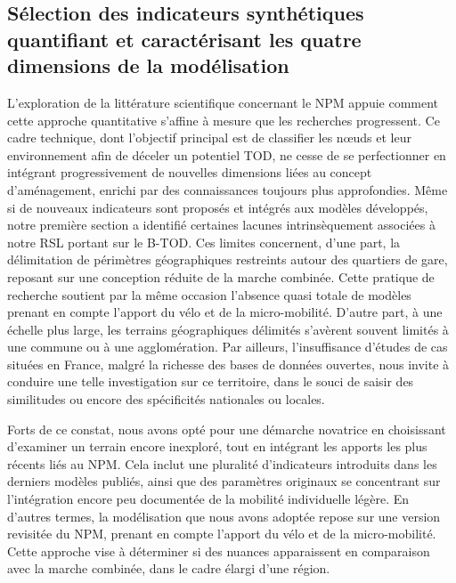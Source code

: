 \begin{refsegment}
    \newpage
\section{Sélection des indicateurs synthétiques quantifiant et caractérisant les quatre dimensions de la modélisation
    \label{chap6:selection-indicateurs}
    }

L'exploration de la littérature scientifique concernant le \acrshort{NPM} appuie comment cette approche quantitative s'affine à mesure que les recherches progressent. Ce cadre technique, dont l'objectif principal est de classifier les nœuds et leur environnement afin de déceler un potentiel \acrshort{TOD}, ne cesse de se perfectionner en intégrant progressivement de nouvelles dimensions liées au concept d'aménagement, enrichi par des connaissances toujours plus approfondies. Même si de nouveaux indicateurs sont proposés et intégrés aux modèles développés, notre première section a identifié certaines lacunes intrinsèquement associées à notre \acrshort{RSL} portant sur le \acrshort{B-TOD}. Ces limites concernent, d'une part, la délimitation de périmètres géographiques restreints autour des quartiers de gare, reposant sur une conception réduite de la marche combinée. Cette pratique de recherche soutient par la même occasion l'absence quasi totale de modèles prenant en compte l'apport du vélo et de la micro-mobilité. D'autre part, à une échelle plus large, les terrains géographiques délimités s'avèrent souvent limités à une commune ou à une agglomération. Par ailleurs, l'insuffisance d'études de cas situées en France, malgré la richesse des bases de données ouvertes, nous invite à conduire une telle investigation sur ce territoire, dans le souci de saisir des similitudes ou encore des spécificités nationales ou locales.%

Forts de ce constat, nous avons opté pour une démarche novatrice en choisissant d'examiner un terrain encore inexploré, tout en intégrant les apports les plus récents liés au \acrshort{NPM}. Cela inclut une pluralité d'indicateurs introduits dans les derniers modèles publiés, ainsi que des paramètres originaux se concentrant sur l'intégration encore peu documentée de la mobilité individuelle légère. En d'autres termes, la modélisation que nous avons adoptée repose sur une version revisitée du \acrshort{NPM}, prenant en compte l'apport du vélo et de la micro-mobilité. Cette approche vise à déterminer si des nuances apparaissent en comparaison avec la marche combinée, dans le cadre élargi d'une région.%


\end{refsegment}
